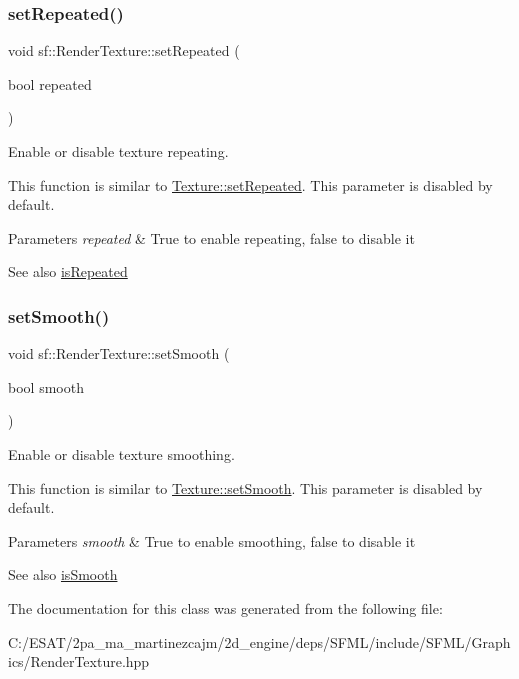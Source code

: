 \subsubsection{\texorpdfstring{set\+Repeated()}{setRepeated()}}
{\footnotesize\ttfamily void sf\+::\+Render\+Texture\+::set\+Repeated (\begin{DoxyParamCaption}\item[{bool}]{repeated }\end{DoxyParamCaption})}



Enable or disable texture repeating. 

This function is similar to \hyperlink{classsf_1_1_texture_aaa87d1eff053b9d4d34a24c784a28658}{Texture\+::set\+Repeated}. This parameter is disabled by default.


\begin{DoxyParams}{Parameters}
{\em repeated} & True to enable repeating, false to disable it\\
\hline
\end{DoxyParams}
\begin{DoxySeeAlso}{See also}
\hyperlink{classsf_1_1_render_texture_a81c5a453a21c7e78299b062b97dc8c87}{is\+Repeated} 
\end{DoxySeeAlso}
\mbox{\label{classsf_1_1_render_texture_af08991e63c6020865dd07b20e27305b6}} 
\subsubsection{\texorpdfstring{set\+Smooth()}{setSmooth()}}
{\footnotesize\ttfamily void sf\+::\+Render\+Texture\+::set\+Smooth (\begin{DoxyParamCaption}\item[{bool}]{smooth }\end{DoxyParamCaption})}



Enable or disable texture smoothing. 

This function is similar to \hyperlink{classsf_1_1_texture_a0c3bd6825b9a99714f10d44179d74324}{Texture\+::set\+Smooth}. This parameter is disabled by default.


\begin{DoxyParams}{Parameters}
{\em smooth} & True to enable smoothing, false to disable it\\
\hline
\end{DoxyParams}
\begin{DoxySeeAlso}{See also}
\hyperlink{classsf_1_1_render_texture_a5b43c007ab6643accc5dae84b5bc8f61}{is\+Smooth} 
\end{DoxySeeAlso}


The documentation for this class was generated from the following file\+:\begin{DoxyCompactItemize}
\item 
C\+:/\+E\+S\+A\+T/2pa\+\_\+ma\+\_\+martinezcajm/2d\+\_\+engine/deps/\+S\+F\+M\+L/include/\+S\+F\+M\+L/\+Graphics/Render\+Texture.\+hpp\end{DoxyCompactItemize}
